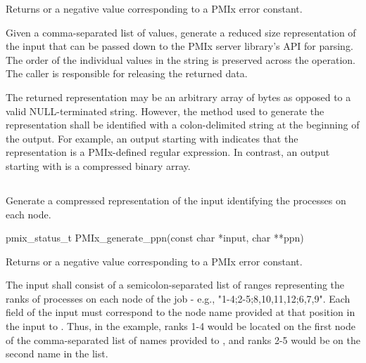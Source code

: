 Returns  or a negative value corresponding to a PMIx error constant.

\descr

Given a comma-separated list of  values, generate a reduced size representation of the input that can be passed down to the \ac{PMIx} server library's  \ac{API} for parsing. The order of the individual values in the  string is preserved across the operation. The caller is responsible for releasing the returned data.

\adviceuserstart
The returned representation may be an arbitrary array of bytes as opposed to a valid NULL-terminated string. However, the method used to generate the representation shall be identified with a colon-delimited string at the beginning of the output. For example, an output starting with  indicates that the representation is a \ac{PMIx}-defined regular expression. In contrast, an output starting with  is a compressed binary array.
\adviceuserend


\subsection{}

\summary

Generate a compressed representation of the input identifying the processes on each node.

\format

\cspecificstart
\begin{codepar}
pmix_status_t PMIx_generate_ppn(const char *input, char **ppn)
\end{codepar}
\cspecificend

\begin{arglist}
\end{arglist}

Returns  or a negative value corresponding to a PMIx error constant.

\descr

The input shall consist of a semicolon-separated list of ranges representing the ranks of processes on each node of the job - e.g.,  "1-4;2-5;8,10,11,12;6,7,9". Each field of the input must correspond to the node name provided at that position in the input to . Thus, in the example, ranks 1-4 would be located on the first node of the comma-separated list of names provided to , and ranks 2-5 would be on the second name in the list.

